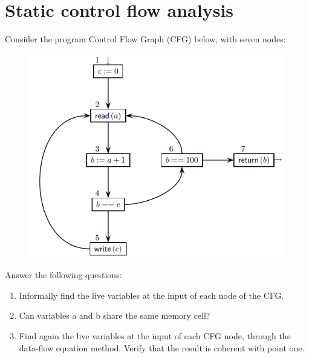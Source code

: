 \documentclass[12pt, a4paper]{report}
\newtheorem[style=M,bodystyle=\normalfont]{theorem}{Theorem}
\newtheorem[style=M,bodystyle=\normalfont]{corollary}{Corollary}
\newtheorem[style=M,bodystyle=\normalfont]{lemma}{Lemma}
\newtheorem[style=M,bodystyle=\normalfont]{definition}{Definition}
\begin{document}
    \section{Static control flow analysis}
        Consider the program Control Flow Graph (CFG) below, with seven nodes:
        \begin{figure}[H]
            \centering
            \includegraphics[width=0.75\linewidth]{images/CFG.png}
        \end{figure} 
        Answer the following questions:
        \begin{enumerate}
            \item Informally find the live variables at the input of each node of the CFG.
            \item Can variables a and b share the same memory cell?
            \item Find again the live variables at the input of each CFG node, through the data-flow equation method. Verify that the result is coherent with point one. 
        \end{enumerate}
\end{document}
